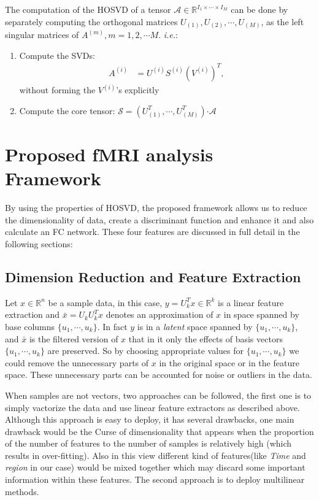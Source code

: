 \documentclass[journal]{IEEEtran}
\begin{document}
	
	
	The computation of the HOSVD of a tensor $\mathcal{A} \in \mathbb{R}^{I_1 \times \cdots \times I_M}$ can be done by separately computing the orthogonal matrices $U_{(1)}, U_{(2)},\cdots,  U_{(M)}$, as the left singular matrices of $A^{(m)}, m = 1, 2, \cdots M$. \textit{i.e.}:
	
	\begin{enumerate} 
		\item Compute the SVDs:
		\begin{align*}
		A^{(i)} &= U^{(i)}S^{(i)}(V^{(i)})^T,
		\end{align*}
		without forming the $V ^{(i)}$’s explicitly
		\item  Compute the core tensor: $\mathcal{S} =\left( U_{(1)}^{T}, \cdots, U_{(M)}^{T} \right) \boldsymbol{\cdot} \mathcal{A}$
	\end{enumerate}
	
	
	
	
	\section{Proposed fMRI analysis Framework}
	By using the properties of HOSVD, the proposed framework allows us to reduce the dimensionality of data, create a discriminant function and enhance it and also calculate an FC network. These four features are discussed in full detail in the following sections:
	
	
	\subsection{Dimension Reduction and Feature Extraction}
	Let $x\in \mathbb{R}^n$ be a sample data, in this case, 
	$y = U^T_k x \in \mathbb{R}^k$ is a linear feature extraction and 
	$\bar{x}  = U_k U_k^T x$ denotes an approximation of $x$ in space spanned by base columns $\{ u_1,\cdots, u_k \}$. In fact $y$ is in a \textit{latent} space spanned by $\{ u_1,\cdots, u_k \}$, and 
	$\bar{x}$ is the filtered version of $x$ that in it only the effects of basis vectors $\{ u_1,\cdots, u_k \}$ are preserved. So by choosing appropriate values for $\{ u_1,\cdots, u_k \}$ we could remove the unnecessary parts of $x$ in the original space or in the feature space. These unnecessary parts can be accounted for noise or outliers in the data.
	
	When  samples are not vectors, two approaches can be followed, the first one is to simply vactorize the data and use linear feature extractors as described above. Although this approach is easy to deploy, it has several drawbacks, one main drawback would be the Curse of dimensionality that appears when the proportion of the number of features to the number of samples is relatively high (which results in over-fitting). 
	Also in this view different kind of features(like \emph{Time} and \emph{region} in our case) would be mixed together which may discard some important information within these features. The second approach is to deploy multilinear methods. 
	
\end{document}
